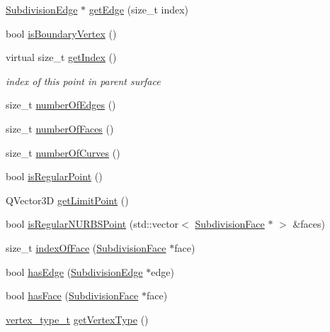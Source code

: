 \begin{DoxyCompactItemize}
\item 
\hyperlink{classShipCAD_1_1SubdivisionEdge}{Subdivision\-Edge} $\ast$ \hyperlink{classShipCAD_1_1SubdivisionPoint_a518c4e3dc5de74950c87ff0f733716ba}{get\-Edge} (size\-\_\-t index)
\item 
bool \hyperlink{classShipCAD_1_1SubdivisionPoint_afbcf1244015a92be04faed20163699f7}{is\-Boundary\-Vertex} ()
\item 
virtual size\-\_\-t \hyperlink{classShipCAD_1_1SubdivisionPoint_a8406682549c10ec9e1a184132f6ed2f0}{get\-Index} ()
\begin{DoxyCompactList}\small\item\em index of this point in parent surface \end{DoxyCompactList}\item 
size\-\_\-t \hyperlink{classShipCAD_1_1SubdivisionPoint_a0bc218bf0b1982a6d622535c2653200e}{number\-Of\-Edges} ()
\item 
size\-\_\-t \hyperlink{classShipCAD_1_1SubdivisionPoint_aac07ee9bc037a35a244ab179cf7bd344}{number\-Of\-Faces} ()
\item 
size\-\_\-t \hyperlink{classShipCAD_1_1SubdivisionPoint_afc9659ec83083e7725ce14a12a74d2f0}{number\-Of\-Curves} ()
\item 
bool \hyperlink{classShipCAD_1_1SubdivisionPoint_a6a0b4b628563cda2b2979ce6222e8a20}{is\-Regular\-Point} ()
\item 
Q\-Vector3\-D \hyperlink{classShipCAD_1_1SubdivisionPoint_a0eb743069fe2ee2e99cdf7417b2400d5}{get\-Limit\-Point} ()
\item 
bool \hyperlink{classShipCAD_1_1SubdivisionPoint_a88243019864c79766266cee627671183}{is\-Regular\-N\-U\-R\-B\-S\-Point} (std\-::vector$<$ \hyperlink{classShipCAD_1_1SubdivisionFace}{Subdivision\-Face} $\ast$ $>$ \&faces)
\item 
size\-\_\-t \hyperlink{classShipCAD_1_1SubdivisionPoint_a354475f80700fee46dcb46f8602c5345}{index\-Of\-Face} (\hyperlink{classShipCAD_1_1SubdivisionFace}{Subdivision\-Face} $\ast$face)
\item 
bool \hyperlink{classShipCAD_1_1SubdivisionPoint_ada0d082be616958c024bb1743d392e2f}{has\-Edge} (\hyperlink{classShipCAD_1_1SubdivisionEdge}{Subdivision\-Edge} $\ast$edge)
\item 
bool \hyperlink{classShipCAD_1_1SubdivisionPoint_a720d2fc986ba8a365e8722e0e3e28be5}{has\-Face} (\hyperlink{classShipCAD_1_1SubdivisionFace}{Subdivision\-Face} $\ast$face)
\item 
\hyperlink{namespaceShipCAD_a03171cc921c53a568b778f5131a60deb}{vertex\-\_\-type\-\_\-t} \hyperlink{classShipCAD_1_1SubdivisionPoint_a3ccd55795bf99f25b1ad8f937de9670a}{get\-Vertex\-Type} ()

\end{DoxyCompactItemize}
